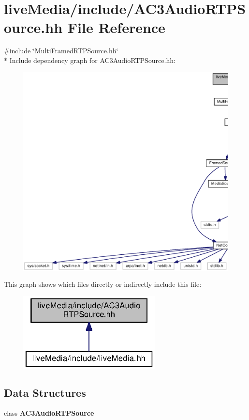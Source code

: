 \section{live\+Media/include/\+A\+C3\+Audio\+R\+T\+P\+Source.hh File Reference}
\label{AC3AudioRTPSource_8hh}
{\ttfamily \#include \char`\"{}Multi\+Framed\+R\+T\+P\+Source.\+hh\char`\"{}}\\*
Include dependency graph for A\+C3\+Audio\+R\+T\+P\+Source.\+hh\+:
\nopagebreak
\begin{figure}[H]
\begin{center}
\leavevmode
\includegraphics[width=350pt]{AC3AudioRTPSource_8hh__incl}
\end{center}
\end{figure}
This graph shows which files directly or indirectly include this file\+:
\nopagebreak
\begin{figure}[H]
\begin{center}
\leavevmode
\includegraphics[width=204pt]{AC3AudioRTPSource_8hh__dep__incl}
\end{center}
\end{figure}
\subsection*{Data Structures}
\begin{DoxyCompactItemize}
\item 
class {\bf A\+C3\+Audio\+R\+T\+P\+Source}
\end{DoxyCompactItemize}
